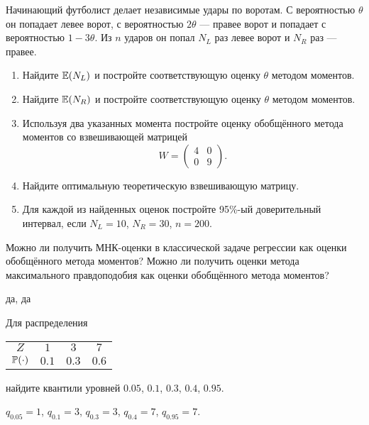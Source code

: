 \begin{problem}
Начинающий футболист делает независимые удары по воротам. С вероятностью $\theta$ он попадает левее ворот, с вероятностью $2\theta$ — правее ворот и попадает с вероятностью $1-3\theta$. Из $n$ ударов он попал $N_L$ раз левее ворот и $N_R$ раз — правее.

\begin{enumerate}
\item Найдите $\E(N_L)$ и постройте соответствующую оценку $\theta$ методом моментов.
\item Найдите $\E(N_R)$ и постройте соответствующую оценку $\theta$ методом моментов.
\item Используя два указанных момента постройте оценку обобщённого метода моментов со  взвешивающей матрицей
\[
W = \begin{pmatrix}
4 & 0 \\
0 & 9
\end{pmatrix}.
\]
\item Найдите оптимальную теоретическую взвешивающую матрицу.
\item Для каждой из найденных оценок постройте 95\%-ый доверительный интервал, если $N_L=10$, $N_R=30$, $n=200$.
\end{enumerate}
\begin{sol}
\end{sol}
\end{problem}



\begin{problem}
Можно ли получить МНК-оценки в классической задаче регрессии как оценки обобщённого метода моментов? Можно ли получить оценки метода максимального правдоподобия как оценки обобщённого метода моментов?
\begin{sol}
да, да
\end{sol}
\end{problem}

\begin{problem}
Для распределения

\begin{tabular}{c|ccc}
\toprule
$Z$ & $1$ & $3$ & $7$ \\
$\P(\cdot)$ & $0.1$ & $0.3$ & $0.6$ \\
\bottomrule
\end{tabular}

найдите квантили уровней $0.05$, $0.1$, $0.3$, $0.4$, $0.95$.

\begin{sol}
$q_{0.05} = 1$, $q_{0.1} = 3$, $q_{0.3} = 3$, $q_{0.4} = 7$, $q_{0.95}=7$.
\end{sol}
\end{problem}



